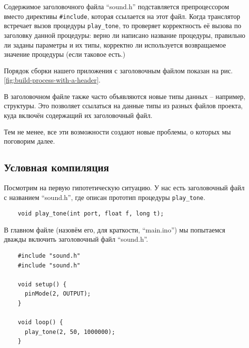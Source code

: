 \documentclass[../sparc.tex]{subfiles}
\begin{document}
Содержимое заголовочного файла ``sound.h'' подставляется препроцессором вместо
директивы \texttt{#include}, которая ссылается на этот файл.  Когда
транслятор встречает вызов процедуры \texttt{play_tone}, то проверяет
корректность её вызова по заголовку данной процедуры: верно ли написано название
процедуры, правильно ли заданы параметры и их типы, корректно ли используется
возвращаемое значение процедуры (если таковое есть.)


Порядок сборки нашего приложения с заголовочным файлом показан на
рис. \ref{fig:build-process-with-a-header}.

В заголовочном файле также часто объявляются новые типы данных -- например,
структуры.  Это позволяет ссылаться на данные типы из разных файлов проекта,
куда включён содержащий их заголовочный файл.

Тем не менее, все эти возможности создают новые проблемы, о которых мы поговорим
далее.

\subsection{Условная компиляция}
\label{subsection:conditional-compiling}

Посмотрим на первую гипотетическую ситуацию.  У нас есть заголовочный файл с
названием ``sound.h'', где описан прототип процедуры
\texttt{play_tone}.

\begin{listing}[H]
  \begin{verbatim}
    void play_tone(int port, float f, long t);
  \end{verbatim}
  \label{listing:game-dev-engine-procedure-header-2}
  \caption{Файл ``sound.h'' с заголовком процедуры.}
\end{listing}

В главном файле (назовём его, для краткости, ``main.ino'') мы попытаемся дважды
включить заголовочный файл ``sound.h''.

\begin{listing}[H]
  \begin{verbatim}
    #include "sound.h"
    #include "sound.h"

    void setup() {
      pinMode(2, OUTPUT);
    }

    void loop() {
      play_tone(2, 50, 1000000);
    }
  \end{verbatim}
  \label{listing:game-dev-engine-procedure-header-include-2}
  \caption{Пример двойного включения заголовочного файла ``sound.h'' с помощью
    директивы препроцессора.}
\end{listing}
\end{document}
